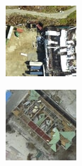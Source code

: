 \begin{figure} [H]
\begin{subfigure}{.275\textwidth}
	\end{subfigure}	
	\par\medskip
	\begin{subfigure}{.275\textwidth}
		\centering
		\includegraphics[width=.95\linewidth]{figs/7.jpg}
	\end{subfigure}
	\begin{subfigure}{.275\textwidth}
		\centering
		\includegraphics[width=.95\linewidth]{figs/8.jpg}

\end{subfigure}
\end{figure}
